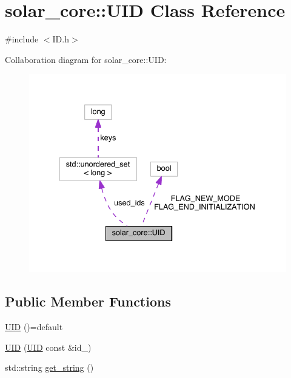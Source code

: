 \hypertarget{classsolar__core_1_1_u_i_d}{}\section{solar\+\_\+core\+:\+:U\+I\+D Class Reference}
\label{classsolar__core_1_1_u_i_d}


{\ttfamily \#include $<$I\+D.\+h$>$}



Collaboration diagram for solar\+\_\+core\+:\+:U\+I\+D\+:\nopagebreak
\begin{figure}[H]
\begin{center}
\leavevmode
\includegraphics[width=335pt]{classsolar__core_1_1_u_i_d__coll__graph}
\end{center}
\end{figure}
\subsection*{Public Member Functions}
\begin{DoxyCompactItemize}
\item 
\hyperlink{classsolar__core_1_1_u_i_d_af5d790831cd429becae2f5143b0f8e92}{U\+I\+D} ()=default
\item 
\hyperlink{classsolar__core_1_1_u_i_d_a23f8078dea147aecd914d1676f09a98a}{U\+I\+D} (\hyperlink{classsolar__core_1_1_u_i_d}{U\+I\+D} const \&id\+\_\+)
\item 
std\+::string \hyperlink{classsolar__core_1_1_u_i_d_a4d0f76d77dd4d4fa9ebcb85e31cd9209}{get\+\_\+string} ()
\end{DoxyCompactItemize}
